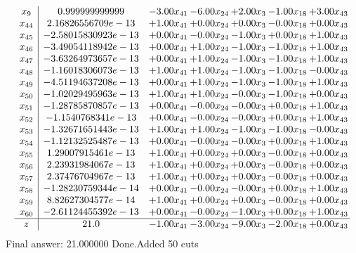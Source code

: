 \documentclass[8pt]{article}
\begin{document}
\[\begin{array}{c| c c@{\hskip 2pt} c@{\hskip 2pt} c@{\hskip 2pt} c@{\hskip 2pt} c@{\hskip 2pt} }
 x_{9}   &  0.999999999999 & -3.00 x_{41} & -6.00 x_{24} & +  2.00 x_{3} & -1.00 x_{18} & +  3.00 x_{43}\\
 x_{44}   &  2.16826556709e-13 & +  1.00 x_{41} & +  0.00 x_{24} & +  0.00 x_{3} & -0.00 x_{18} & +  0.00 x_{43}\\
 x_{45}   &  -2.58015830923e-13 & +  0.00 x_{41} & -0.00 x_{24} & -1.00 x_{3} & +  0.00 x_{18} & +  1.00 x_{43}\\
 x_{46}   &  -3.49054118942e-13 & +  0.00 x_{41} & +  1.00 x_{24} & -1.00 x_{3} & -1.00 x_{18} & +  1.00 x_{43}\\
 x_{47}   &  -3.63264973657e-13 & +  0.00 x_{41} & +  1.00 x_{24} & -1.00 x_{3} & -1.00 x_{18} & +  1.00 x_{43}\\
 x_{48}   &  -1.16018306073e-13 & +  1.00 x_{41} & +  1.00 x_{24} & -1.00 x_{3} & -1.00 x_{18} & -0.00 x_{43}\\
 x_{49}   &  -4.51194637208e-13 & +  0.00 x_{41} & +  1.00 x_{24} & -1.00 x_{3} & -1.00 x_{18} & +  1.00 x_{43}\\
 x_{50}   &  -1.02029495963e-13 & +  1.00 x_{41} & +  1.00 x_{24} & -0.00 x_{3} & -1.00 x_{18} & +  0.00 x_{43}\\
 x_{51}   &  -1.28785870857e-13 & +  0.00 x_{41} & -0.00 x_{24} & -0.00 x_{3} & +  0.00 x_{18} & +  1.00 x_{43}\\
 x_{52}   &  -1.1540768341e-13 & +  0.00 x_{41} & -0.00 x_{24} & -0.00 x_{3} & +  0.00 x_{18} & +  1.00 x_{43}\\
 x_{53}   &  -1.32671651443e-13 & +  1.00 x_{41} & +  1.00 x_{24} & -1.00 x_{3} & -1.00 x_{18} & -0.00 x_{43}\\
 x_{54}   &  -1.12132525487e-13 & +  0.00 x_{41} & -0.00 x_{24} & -0.00 x_{3} & +  0.00 x_{18} & +  1.00 x_{43}\\
 x_{55}   &  1.29007915461e-13 & +  1.00 x_{41} & +  0.00 x_{24} & +  0.00 x_{3} & -0.00 x_{18} & +  0.00 x_{43}\\
 x_{56}   &  2.23931984067e-13 & +  1.00 x_{41} & +  0.00 x_{24} & +  0.00 x_{3} & -0.00 x_{18} & +  0.00 x_{43}\\
 x_{57}   &  2.37476704967e-13 & +  1.00 x_{41} & +  0.00 x_{24} & +  0.00 x_{3} & -0.00 x_{18} & +  0.00 x_{43}\\
 x_{58}   &  -1.28230759344e-14 & +  0.00 x_{41} & -0.00 x_{24} & -0.00 x_{3} & +  0.00 x_{18} & +  1.00 x_{43}\\
 x_{59}   &  8.82627304577e-14 & +  1.00 x_{41} & +  0.00 x_{24} & +  0.00 x_{3} & -0.00 x_{18} & +  0.00 x_{43}\\
 x_{60}   &  -2.61124455392e-13 & +  0.00 x_{41} & -0.00 x_{24} & -1.00 x_{3} & +  0.00 x_{18} & +  1.00 x_{43}\\
\hline
z    &  21.0 & -1.00 x_{41} & -3.00 x_{24} & -9.00 x_{3} & -2.00 x_{18} & +  0.00 x_{43}\\
\end{array}\]
 Final answer: 21.000000 
Done.Added 50 cuts 
\end{document}
